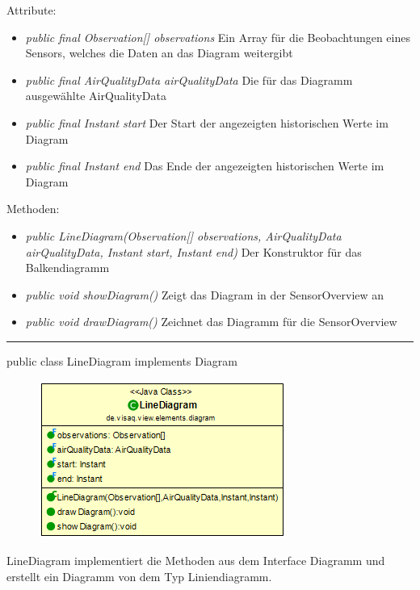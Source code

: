 Attribute:
\begin{itemize}
    \item \emph{public final Observation[] observations} Ein Array für die Beobachtungen eines Sensors, welches die Daten an das Diagram weitergibt
    \item \emph{public final AirQualityData airQualityData} Die für das Diagramm ausgewählte AirQualityData
    \item \emph{public final Instant start} Der Start der angezeigten historischen Werte im Diagram
    \item \emph{public final Instant end} Das Ende der angezeigten historischen Werte im Diagram
\end{itemize}
Methoden:
\begin{itemize}
    \item \emph{public LineDiagram(Observation[] observations, AirQualityData airQualityData, Instant start, Instant end)} Der Konstruktor für das Balkendiagramm
    \item \emph{public void showDiagram()} Zeigt das Diagram in der SensorOverview an
    \item \emph{public void drawDiagram()} Zeichnet das Diagramm für die SensorOverview
\end{itemize}

\rule{\textwidth}{0.4pt}
public class LineDiagram implements Diagram

\begin{minipage}{0.3\textwidth}
    \begin{figure}[H]
        \includegraphics[scale = 0.5]{media/frontend/view/de.view.elements.diagram/LineDiagram_Class.png}
    \end{figure}
    \end{minipage} \hfill
    \begin{minipage}{0.6\textwidth}
LineDiagram implementiert die Methoden aus dem Interface Diagramm und erstellt ein Diagramm von dem Typ Liniendiagramm.
\end{minipage}

